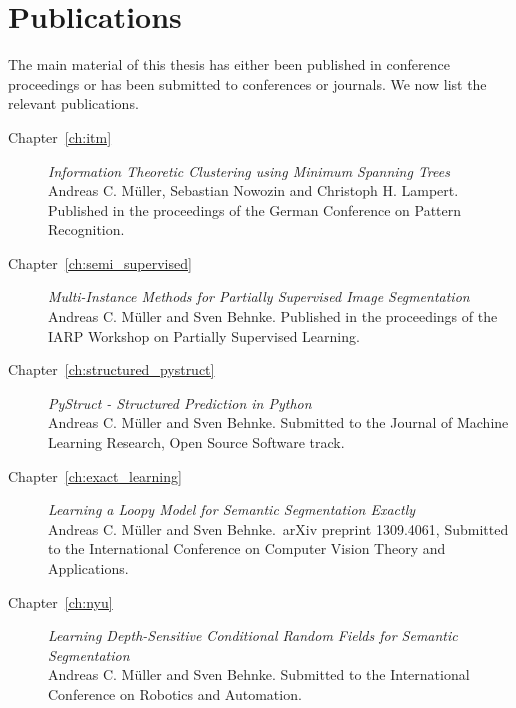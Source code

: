 \section{Publications}
The main material of this thesis has either been published in conference
proceedings or has been submitted to conferences or journals. We now list the
relevant publications.
\begin{description}
    \item[Chapter~\ref{ch:itm}]%
        \emph{Information Theoretic Clustering using Minimum Spanning Trees}\\
        Andreas C. M\"uller, Sebastian Nowozin and Christoph H. Lampert.
        Published in the proceedings of the German Conference on Pattern
        Recognition.
    \item[Chapter~\ref{ch:semi_supervised}]%
        \emph{Multi-Instance Methods for Partially Supervised Image
        Segmentation}\\
        Andreas C. M\"uller and Sven Behnke. Published in the proceedings of
        the IARP Workshop on Partially Supervised Learning.
    \item[Chapter~\ref{ch:structured_pystruct}]%
        \emph{PyStruct - Structured Prediction in Python}\\
        Andreas C. M\"uller and Sven Behnke. Submitted to the Journal of
        Machine Learning Research, Open Source Software track.
    \item[Chapter~\ref{ch:exact_learning}]%
        \emph{Learning a Loopy Model for Semantic Segmentation Exactly}\\
        Andreas C. M\"uller and Sven Behnke.\ arXiv preprint 1309.4061, Submitted to the International
        Conference on Computer Vision Theory and Applications.
    \item[Chapter~\ref{ch:nyu}]%
        \emph{Learning Depth-Sensitive Conditional Random Fields for Semantic Segmentation}\\
        Andreas C. M\"uller and Sven Behnke. Submitted to the International
        Conference on Robotics and Automation.
\end{description}
